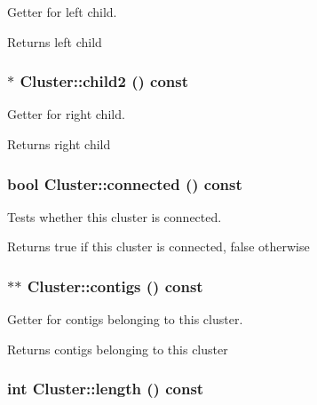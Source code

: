 Getter for left child. \begin{DoxyReturn}{Returns}
left child 
\end{DoxyReturn}
\hypertarget{classCluster_a3a57fd9d973c0314d115b97e954238cc}{
\subsubsection[{child2}]{ $\ast$ Cluster::child2 () const}}
\label{classCluster_a3a57fd9d973c0314d115b97e954238cc}


Getter for right child. \begin{DoxyReturn}{Returns}
right child 
\end{DoxyReturn}
\hypertarget{classCluster_a51d9bba46a318f5c5dda03dc19e08493}{
\subsubsection[{connected}]{\setlength{\rightskip}{0pt plus 5cm}bool Cluster::connected () const}}
\label{classCluster_a51d9bba46a318f5c5dda03dc19e08493}


Tests whether this cluster is connected. \begin{DoxyReturn}{Returns}
true if this cluster is connected, false otherwise 
\end{DoxyReturn}
\hypertarget{classCluster_ae79428737f0fea472a2de3b394d405f3}{
\subsubsection[{contigs}]{ $\ast$$\ast$ Cluster::contigs () const}}
\label{classCluster_ae79428737f0fea472a2de3b394d405f3}


Getter for contigs belonging to this cluster. \begin{DoxyReturn}{Returns}
contigs belonging to this cluster 
\end{DoxyReturn}
\hypertarget{classCluster_a07321970fe71eb6839007ae0d75af66b}{
\subsubsection[{length}]{\setlength{\rightskip}{0pt plus 5cm}int Cluster::length () const}}
\label{classCluster_a07321970fe71eb6839007ae0d75af66b}


